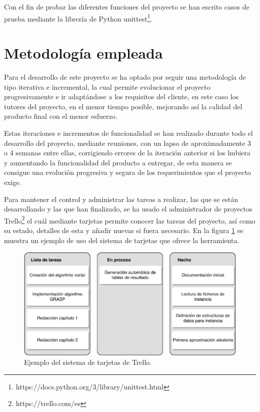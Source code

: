 Con el fin de probar las diferentes funciones del proyecto se han escrito casos de prueba mediante la librería de Python unittest\footnote{https://docs.python.org/3/library/unittest.html}.

\section{Metodología empleada}
Para el desarrollo de este proyecto se ha optado por seguir una metodología de tipo iterativa e incremental, la cual permite evolucionar el proyecto progresivamente e ir adaptándose a los requisitos del cliente, en este caso los tutores del proyecto, en el menor tiempo posible, mejorando así la calidad del producto final con el menor esfuerzo.

Estas iteraciones e incrementos de funcionalidad se han realizado durante todo el desarrollo del proyecto, mediante reuniones, con un lapso de aproximadamente 3 o 4 semanas entre ellas, corrigiendo errores de la iteración anterior si los hubiera y aumentando la funcionalidad del producto a entregar, de esta manera se consigue una evolución progresiva y segura de los requerimientos que el proyecto exige.

Para mantener el control y administrar las tareas a realizar, las que se están desarrollando y las que han finalizado, se ha usado el administrador de proyectos Trello\footnote{https://trello.com/es} el cuál mediante tarjetas permite conocer las tareas del proyecto, así como su estado, detalles de esta y añadir nuevas si fuera necesario. En la figura \ref{fig:trello-tarjetas} se muestra un ejemplo de uso del sistema de tarjetas que ofrece la herramienta.

\begin{figure}[H]
	\centering
	\includegraphics{Figures/trello-tarjetas.pdf}
	\caption{Ejemplo del sistema de tarjetas de Trello.}
	\label{fig:trello-tarjetas}
\end{figure}


